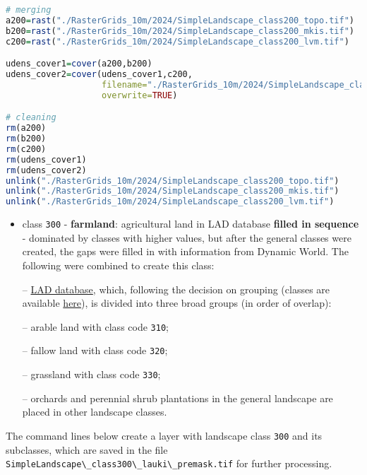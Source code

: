 \documentclass[
]{book}
\newcommand{\passthrough}[1]{#1}
\begin{document}
\begin{lstlisting}[language=R]
# merging
a200=rast("./RasterGrids_10m/2024/SimpleLandscape_class200_topo.tif")
b200=rast("./RasterGrids_10m/2024/SimpleLandscape_class200_mkis.tif")
c200=rast("./RasterGrids_10m/2024/SimpleLandscape_class200_lvm.tif")

udens_cover1=cover(a200,b200)
udens_cover2=cover(udens_cover1,c200,
                   filename="./RasterGrids_10m/2024/SimpleLandscape_class200_udens_premask.tif",
                   overwrite=TRUE)

# cleaning
rm(a200)
rm(b200)
rm(c200)
rm(udens_cover1)
rm(udens_cover2)
unlink("./RasterGrids_10m/2024/SimpleLandscape_class200_topo.tif")
unlink("./RasterGrids_10m/2024/SimpleLandscape_class200_mkis.tif")
unlink("./RasterGrids_10m/2024/SimpleLandscape_class200_lvm.tif")
\end{lstlisting}

\begin{itemize}
\item
  class \passthrough{\lstinline!300!} - \textbf{farmland}: agricultural land in LAD database \textbf{filled in
  sequence} - dominated by classes with higher values, but after the general
  classes were created, the gaps were filled in with information from Dynamic
  World. The following were combined to create this class:

  -- \hyperref[Ch04.02]{LAD database}, which, following the decision on grouping (classes are
  available \href{https://github.com/aavotins/HiQBioDiv_EGVs/blob/main/Data/Geodata/2024/LAD/KulturuKodi_2024.xlsx}{here}),
  is divided into three broad groups (in order of overlap):

  -- arable land with class code \passthrough{\lstinline!310!};

  -- fallow land with class code \passthrough{\lstinline!320!};

  -- grassland with class code \passthrough{\lstinline!330!};

  -- orchards and perennial shrub plantations in the general landscape are placed
  in other landscape classes.
\end{itemize}

The command lines below create a layer with landscape class \passthrough{\lstinline!300!} and its
subclasses, which are saved in the file \passthrough{\lstinline!SimpleLandscape\_class300\_lauki\_premask.tif!}
for further processing.
\end{document}
